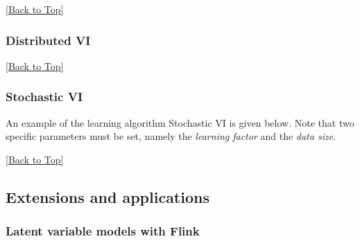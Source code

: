 \documentclass[10pt,a4paper]{article}
\begin{document}

\hyperref[sec:flinklink]{[Back to Top]}\newline 


\subsubsection{Distributed VI}\label{sec:flinklink:learning:dvi}


\hyperref[sec:flinklink]{[Back to Top]}\newline 

\subsubsection{Stochastic VI}\label{sec:flinklink:learning:svi}

An example of the learning algorithm Stochastic VI is given below. Note that two specific parameters must be set, namely the \textit{learning factor} and the \textit{data size}.


\hyperref[sec:flinklink]{[Back to Top]}\newline 




\subsection{Extensions and applications}\label{sec:flinklink:ext}
\subsubsection{Latent variable models with Flink}\label{sec:flinklink:ext:models}
\end{document}
